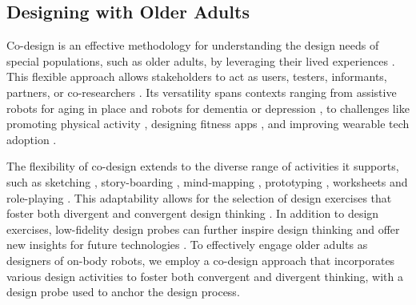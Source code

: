 \subsection{Designing with Older Adults}

Co-design is an effective methodology for understanding the design needs of special populations, such as older adults, by leveraging their lived experiences \cite{rogers2022maximizing, alves2015social, ostrowski2021personal}. This flexible approach allows stakeholders to act as users, testers, informants, partners, or co-researchers \cite{alves2021children, nanavati2023design}. Its versatility spans contexts ranging from assistive robots for aging in place \cite{lee2018reframing, alves2015social} and robots for dementia or depression \cite{moharana2019robots, lee2017steps}, to challenges like promoting physical activity \cite{antony2023codesign}, designing fitness apps \cite{harrington2018designing}, and improving wearable tech adoption \cite{nevay2015role}.

The flexibility of co-design extends to the diverse range of activities it supports, such as sketching \cite{lee2017steps}, story-boarding \cite{bjorling2019participatory}, mind-mapping \cite{antony2023codesign}, prototyping \cite{bjorling2019participatory, lee2017steps}, worksheets \cite{axelsson2021social} and role-playing \cite{bjorling2019participatory}. This adaptability allows for the selection of design exercises that foster both divergent and convergent design thinking \cite{ostrowski2021long}. In addition to design exercises, low-fidelity design probes can further inspire design thinking and offer new insights for future technologies \cite{hutchinson2003technology, gough2021co}. To effectively engage older adults as designers of on-body robots, we employ a co-design approach that incorporates various design activities to foster both convergent and divergent thinking, with a design probe used to anchor the design process. 


